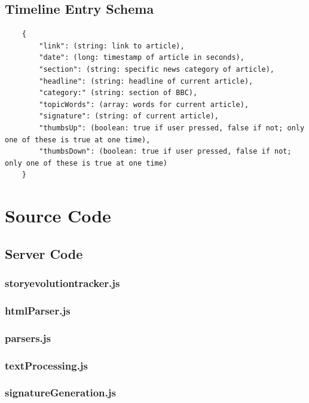 \documentclass[11pt,titlepage]{report}
\begin{document}
\section{Timeline Entry Schema}
\begin{lstlisting}
    {
        "link": (string: link to article),
        "date": (long: timestamp of article in seconds),
        "section": (string: specific news category of article),
        "headline": (string: headline of current article),
        "category:" (string: section of BBC),
        "topicWords": (array: words for current article),
        "signature": (string: of current article),
        "thumbsUp": (boolean: true if user pressed, false if not; only one of these is true at one time),
        "thumbsDown": (boolean: true if user pressed, false if not; only one of these is true at one time)
    }
\end{lstlisting}
\chapter{Source Code}
\newcommand{\includecode}[1]{}
\section{Server Code}
\subsection{storyevolutiontracker.js}
\includecode{/Users/violet/Development/StoryEvolutionTracker/server/storyevolutiontracker.js}
\subsection{htmlParser.js}
\includecode{/Users/violet/Development/StoryEvolutionTracker/server/htmlParser.js}
\subsection{parsers.js}
\includecode{/Users/violet/Development/StoryEvolutionTracker/server/parsers.js}
\subsection{textProcessing.js}
\includecode{/Users/violet/Development/StoryEvolutionTracker/server/textProcessing.js}
\subsection{signatureGeneration.js}
\includecode{/Users/violet/Development/StoryEvolutionTracker/server/signatureGeneration.js}
\end{document}
